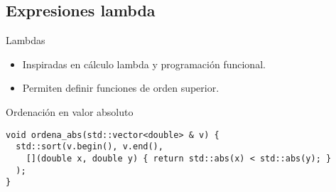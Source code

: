 \subsection{Expresiones lambda}

\begin{frame}[t,fragile]{Lambdas}
\begin{itemize}
  \item Inspiradas en cálculo lambda y programación funcional.
  \item Permiten definir funciones de orden superior.
\end{itemize}
\vfill\pause
\begin{block}{Ordenación en valor absoluto}
\begin{lstlisting}
void ordena_abs(std::vector<double> & v) {
  std::sort(v.begin(), v.end(),
    [](double x, double y) { return std::abs(x) < std::abs(y); }
  );
}
\end{lstlisting}
\end{block}
\end{frame}
